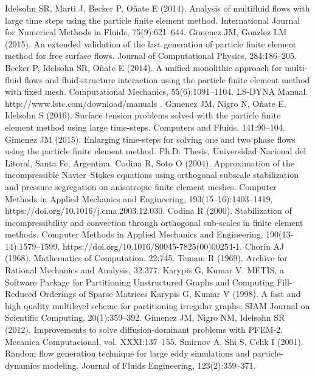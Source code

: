  Idelsohn SR, Marti J, Becker P, Oñate E (2014). Analysis of multifluid flows with large time steps using the particle finite element method. International Journal for Numerical Methods in Fluids, 75(9):621--644.
 Gimenez JM, Gonzlez LM (2015). An extended validation of the last generation of particle finite element method for free surface flows. Journal of Computational Physics, 284:186--205.
 Becker P, Idelsohn SR, Oñate E (2014). A unified monolithic approach for multi-fluid flows and fluid-structure interaction using the particle finite element method with fixed mesh. Computational Mechanics, 55(6):1091--1104.
 LS-DYNA Manual.\\
http://www.lstc.com/download/manuals .
 Gimenez JM, Nigro N, Oñate E, Idelsohn S (2016). Surface tension problems solved with the particle finite element method using large time-steps. Computers and Fluids, 141:90--104.
 Gimenez JM (2015). Enlarging time-steps for solving one and two phase flows using the particle finite element method. Ph.D. Thesis, Universidad Nacional del Litoral, Santa Fe, Argentina.
 Codina R, Soto O (2004). Approximation of the incompressible Navier–Stokes equations using orthogonal subscale stabilization and pressure segregation on anisotropic finite element meshes. Computer Methods in Applied Mechanics and Engineering, 193(15--16):1403--1419, https://doi.org/10.1016/j.cma.2003.12.030.
 Codina R (2000). Stabilization of incompressibility and convection through orthogonal sub-scales in finite element methods. Computer Methods in Applied Mechanics and Engineering, 190(13-14):1579--1599, https://doi.org/10.1016/S0045-7825(00)00254-1.
 Chorin AJ (1968). Mathematics of Computation. 22:745.
 Temam R (1969). Archive for Rational Mechanics and Analysis, 32:377.
 Karypis G, Kumar V. METIS, a Software Package for Partitioning Unstructured Graphs and Computing Fill-Reduced Orderings of Sparse Matrices
 Karypis G, Kumar V (1998). A fast and high quality multilevel scheme for partitioning irregular graphs. SIAM Journal on Scientific Computing, 20(1):359--392.
 Gimenez JM, Nigro NM, Idelsohn SR (2012). Improvements to solve diffusion-dominant problems with PFEM-2. Mecanica Computacional, vol. XXXI:137–155.
 Smirnov A, Shi S, Celik I (2001). Random flow generation technique for large eddy simulations and particle-dynamics modeling. Journal of Fluids Engineering, 123(2):359--371.
